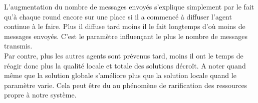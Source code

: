 L'augmentation du nombre de messages envoyés s'explique simplement par le fait qu'à chaque round encore sur une place si il a commencé à diffuser l'agent continue à le faire. Plus il diffuse tard moins il le fait longtemps d'où moins de messages envoyés. C'est le paramètre influençant le plus le nombre de messages transmis.\\

Par contre, plus les autres agents sont prévenus tard, moins il ont le temps de réagir donc plus la qualité locale et totale des solutions décroît. A noter quand même que la solution globale s'améliore plus que la solution locale quand le paramètre varie. Cela peut être du au phénomène de rarification des ressources propre à notre système.

\begin{figure}
  \begin{center}
    
    

\end{center}
\end{figure}
